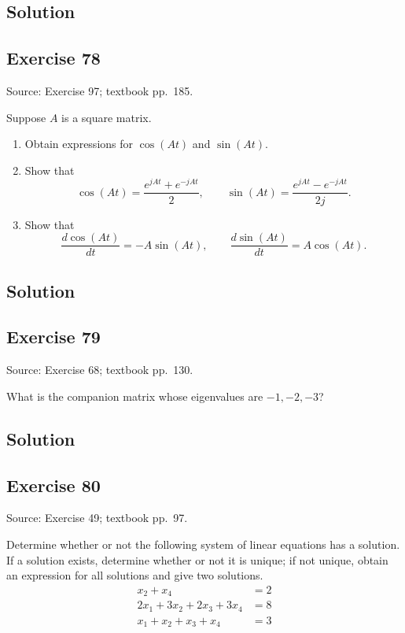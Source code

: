 \documentclass[12pt,a4paper]{article}
\newlength{\questionroom}
\newenvironment{questionprompt}{%
  \begin{lrbox}{\questionbox}\begin{minipage}{\linewidth}%
}{%
  \end{minipage}\end{lrbox}%
  \setlength{\questionroom}{\dimexpr\ht\questionbox+\dp\questionbox+5.2cm\relax}%
  \ifdim\questionroom>\textheight\setlength{\questionroom}{\textheight}\fi
  \Needspace{\questionroom}%
  \noindent\usebox{\questionbox}\par
}
\begin{document}
\subsection*{Solution}
\vspace{3.5cm}


\begin{questionprompt}
\section*{Exercise 78}
\label{practice:78}
{\small Source: Exercise 97; textbook pp.~185.}\par
Suppose $A$ is a square matrix.
\begin{enumerate}[label=(\alph*)]
\item Obtain expressions for $\cos(At)$ and $\sin(At)$.
\item Show that
\[\cos(At)=\frac{e^{jAt}+e^{-jAt}}{2},\qquad
\sin(At)=\frac{e^{jAt}-e^{-jAt}}{2j}.\]
\item Show that
\[\frac{d\cos(At)}{dt}=-A\sin(At),\qquad\frac{d\sin(At)}{dt}=A\cos(At).\]
\end{enumerate}
\end{questionprompt}
\subsection*{Solution}
\vspace{3.5cm}


\begin{questionprompt}
\section*{Exercise 79}
\label{practice:79}
{\small Source: Exercise 68; textbook pp.~130.}\par
What is the companion matrix whose eigenvalues are $-1,-2,-3$?
\end{questionprompt}
\subsection*{Solution}
\vspace{3.5cm}


\begin{questionprompt}
\section*{Exercise 80}
\label{practice:80}
{\small Source: Exercise 49; textbook pp.~97.}\par
Determine whether or not the following system of linear equations has a solution. If a solution exists, determine whether or not it is unique; if not unique, obtain an expression for all solutions and give two solutions.
\begin{align*}x_2+x_4&=2\\2x_1+3x_2+2x_3+3x_4&=8\\x_1+x_2+x_3+x_4&=3\end{align*}
\end{questionprompt}
\end{document}
